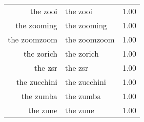 \begin{table}[ht]
\begin{tabular}{rlr}
  the zooi & the zooi & 1.00 \\ 
  the zooming & the zooming & 1.00 \\ 
  the zoomzoom & the zoomzoom & 1.00 \\ 
  the zorich & the zorich & 1.00 \\ 
  the zsr & the zsr & 1.00 \\ 
  the zucchini & the zucchini & 1.00 \\ 
  the zumba & the zumba & 1.00 \\ 
  the zune & the zune & 1.00 \\ 
   \hline
\end{tabular}
\end{table}
